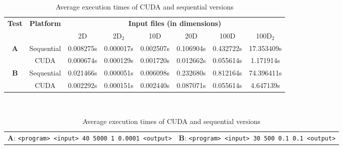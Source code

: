 \documentclass[11pt, journal]{IEEEtran}
\newcommand{\nwl}{

\vspace{11pt}

}
\begin{document}
\begin{table}
    \renewcommand{\arraystretch}{1.3}
    \caption{Average execution times of CUDA and sequential versions}
    \label{cuda_seq_exec}
    \centering
    \begin{tabular}{|c|c||c|c|c|c|c|c|}
    \hline
    \multirow{2}{*}{\textbf{Test}} & \multirow{2}{*}{\textbf{Platform}} & \multicolumn{6}{|c|}{\textbf{Input files (in dimensions)}} \\\cline{3-8}
     & & 2D & 2D$_2$ & 10D & 20D & 100D & 100D$_2$ \\
    \hline\hline
    \multirow{2}{*}{\textbf{A}} & Sequential & 0.008275s & 0.000017s & 0.002507s & 0.106904s & 0.432722s & 17.353409s \\\cline{2-8}
     & CUDA & 0.000674s & 0.000129s & 0.001720s & 0.012662s & 0.055614s & 1.171914s \\
    \hline
    \multirow{2}{*}{\textbf{B}} & Sequential & 0.021466s & 0.000051s & 0.006098s & 0.232680s & 0.812164s & 74.396411s \\\cline{2-8}
     & CUDA & 0.002292s & 0.000151s & 0.002440s & 0.087071s & 0.055614s & 4.647139s \\
    \hline
    \end{tabular}
    \\
    \nwl
    \begin{tabular}{c c}
    \textbf{A}: \verb|<program> <input> 40 5000 1 0.0001 <output>| & \textbf{B}: \verb|<program> <input> 30 500 0.1 0.1 <output>|        
    \end{tabular}
\end{table}
\end{document}
